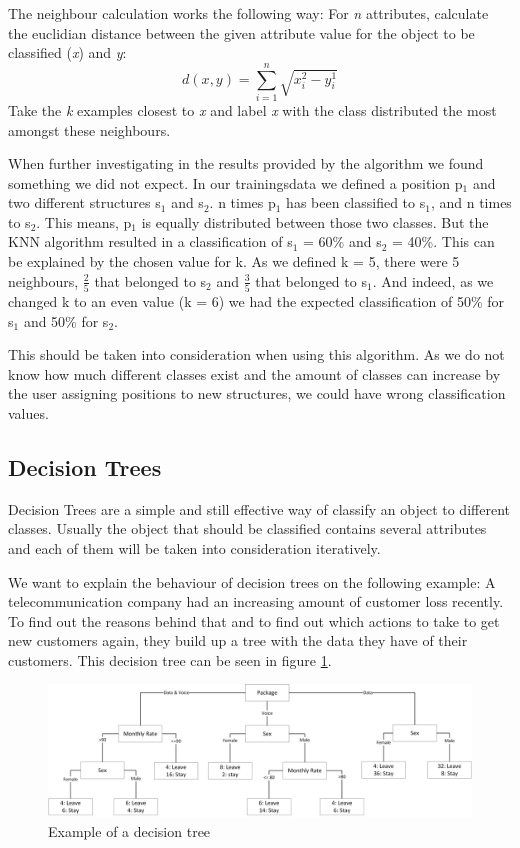 The neighbour calculation works the following way: For \emph{n} attributes, calculate the euclidian distance between the given attribute value for the object to be classified (\emph{x}) and \emph{y}:
\[
d(x, y) = \sum\limits_{i=1}^n \sqrt{x_i^2 - y_i^1}
\]
Take the \emph{k} examples closest to \emph{x} and label \emph{x} with the class distributed the most amongst these neighbours.

When further investigating in the results provided by the algorithm we found something we did not expect. In our trainingsdata we defined a position p$_1$ and two different structures s$_1$ and s$_2$. n times p$_1$ has been classified to s$_1$, and n times to s$_2$. This means, p$_1$ is equally distributed between those two classes. But the KNN algorithm resulted in a classification of s$_1$ = 60\% and s$_2$ = 40\%. This can be explained by the chosen value for k. As we defined k = 5, there were 5 neighbours, $\frac{2}{5}$ that belonged to s$_2$ and $\frac{3}{5}$ that belonged to s$_1$. And indeed, as we changed k to an even value (k = 6) we had the expected classification of 50\% for s$_1$ and 50\% for s$_2$.

This should be taken into consideration when using this algorithm. As we do not know how much different classes exist and the amount of classes can increase by the user assigning positions to new structures, we could have wrong classification values.

\subsection{Decision Trees}
\label{sec4.2.2}
Decision Trees are a simple and still effective way of classify an object to different classes. Usually the object that should be classified contains several attributes and each of them will be taken into consideration iteratively.

We want to explain the behaviour of decision trees on the following example: 
A telecommunication company had an increasing amount of customer loss recently. To find out the reasons behind that and to find out which actions to take to get new customers again, they build up a tree with the data they have of their customers. This decision tree can be seen in figure \ref{decisionTreeExample}.

\begin{figure}[ht!]
\centering
\includegraphics[width=\textwidth]{Images/ML/DecisionTreeExample.jpg}
\caption{Example of a decision tree \label{decisionTreeExample}}
\end{figure}

